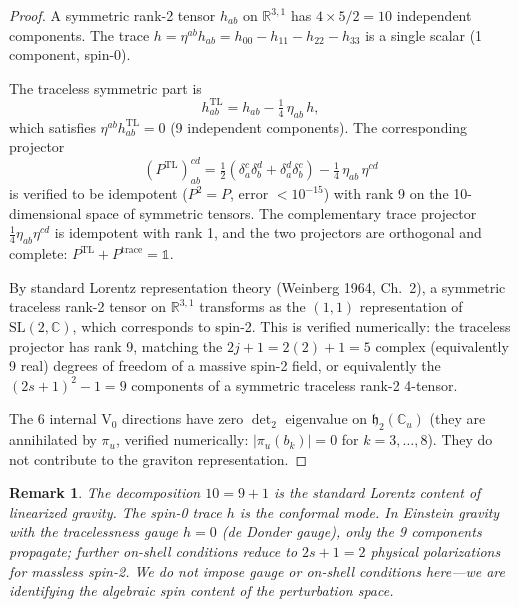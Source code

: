 \documentclass[11pt]{article}
\newtheorem{remark}{Remark}
\newcommand{\h}{\mathfrak{h}}
\begin{document}
\begin{proof}
A symmetric rank-2 tensor $h_{ab}$ on $\mathbb{R}^{3,1}$ has
$4 \times 5/2 = 10$ independent components.
The trace $h = \eta^{ab} h_{ab} = h_{00} - h_{11} - h_{22} - h_{33}$
is a single scalar (1 component, spin-0).

The traceless symmetric part is
\begin{equation}\label{eq:50.3}
  h_{ab}^{\mathrm{TL}} = h_{ab} - \tfrac{1}{4}\,\eta_{ab}\,h,
\end{equation}
which satisfies $\eta^{ab} h_{ab}^{\mathrm{TL}} = 0$ (9 independent
components). The corresponding projector
\begin{equation}\label{eq:50.4}
  (P^{\mathrm{TL}})^{cd}_{ab}
    = \tfrac{1}{2}(\delta^c_a \delta^d_b + \delta^d_a \delta^c_b)
    - \tfrac{1}{4}\,\eta_{ab}\,\eta^{cd}
\end{equation}
is verified to be idempotent ($P^2 = P$, error $<10^{-15}$) with rank 9
on the 10-dimensional space of symmetric tensors. The complementary trace
projector $\tfrac{1}{4}\eta_{ab}\eta^{cd}$ is idempotent with rank 1,
and the two projectors are orthogonal and complete:
$P^{\mathrm{TL}} + P^{\mathrm{trace}} = \mathbb{1}$.

By standard Lorentz representation theory (Weinberg 1964, Ch.~2),
a symmetric traceless rank-2 tensor on $\mathbb{R}^{3,1}$ transforms
as the $(1,1)$ representation of $\mathrm{SL}(2,\mathbb{C})$, which
corresponds to spin-2. This is verified numerically: the traceless
projector has rank 9, matching the $2j+1 = 2(2)+1 = 5$ complex
(equivalently 9 real) degrees of freedom of a massive spin-2 field,
or equivalently the $(2s+1)^2 - 1 = 9$ components of a symmetric
traceless rank-2 4-tensor.

The 6 internal V$_0$ directions have zero $\det_2$ eigenvalue on
$\h_2(\mathbb{C}_u)$ (they are annihilated by $\pi_u$, verified
numerically: $|\pi_u(b_k)| = 0$ for $k=3,\ldots,8$). They do not
contribute to the graviton representation.
\end{proof}

\begin{remark}
The decomposition $10 = 9 + 1$ is the standard Lorentz content of
linearized gravity. The spin-0 trace $h$ is the conformal mode.
In Einstein gravity with the tracelessness gauge $h = 0$ (de Donder gauge),
only the 9 components propagate; further on-shell conditions reduce to
$2s+1 = 2$ physical polarizations for massless spin-2.
We do not impose gauge or on-shell conditions here---we are identifying
the algebraic spin content of the perturbation space.
\end{remark}
\end{document}
